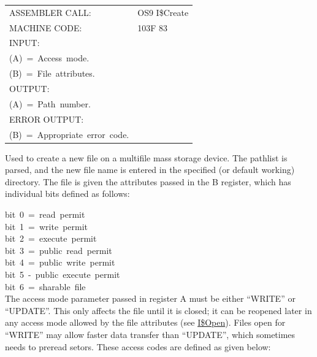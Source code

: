 \documentclass[
]{article}
\newcounter{none} %
\begin{document}
{\def\LTcaptype{none} %
\begin{longtable}[]{@{}
  >{\raggedright\arraybackslash}p{}
  >{\raggedright\arraybackslash}p{}@{}}
\toprule\noalign{}
\endhead
\bottomrule\noalign{}
\endlastfoot
ASSEMBLER CALL: & OS9 I\$Create \\
MACHINE CODE: & 103F 83 \\
INPUT: & \begin{minipage}[t]{\linewidth}\raggedright
(X)~=~Address~of~the~pathlist.\\
(A)~=~Access~mode.\\
(B)~=~File~attributes.
\end{minipage} \\
OUTPUT: & \begin{minipage}[t]{\linewidth}\raggedright
(X)~=~Updated~past~the~pathlist~(trailing~blanks~skipped)\\
(A)~=~Path~number.
\end{minipage} \\
ERROR OUTPUT: & \begin{minipage}[t]{\linewidth}\raggedright
(CC)~=~C~bit~set.\\
(B)~=~Appropriate~error~code.
\end{minipage} \\
\end{longtable}
}

Used to create a new file on a multifile mass storage device. The
pathlist is parsed, and the new file name is entered in the specified
(or default working) directory. The file is given the attributes passed
in the B register, which has individual bits defined as follows:

bit~0~=~read~permit\\
bit~1~=~write~permit\\
bit~2~=~execute~permit\\
bit~3~=~public~read~permit\\
bit~4~=~public~write~permit\\
bit~5~-~public~execute~permit\\
bit~6~=~sharable~file\\

The access mode parameter passed in register A must be either ``WRITE''
or ``UPDATE''. This only affects the file until it is closed; it can be
reopened later in any access mode allowed by the file attributes (see
\hyperref[i.open]{I\$Open}). Files open for ``WRITE'' may allow faster
data transfer than ``UPDATE'', which sometimes needs to preread setors.
These access codes are defined as given below:
\end{document}
